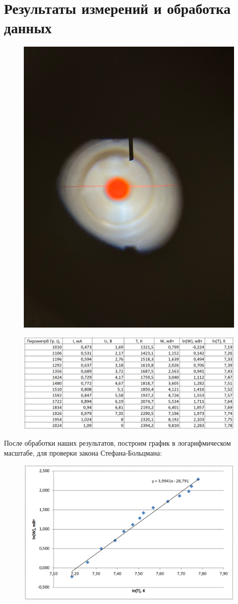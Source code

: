 \documentclass[a4paper, 12pt]{article}
\begin{document}
    

\section{Результаты измерений и обработка данных} 

    \begin{figure}[H]
        \centering
        \includegraphics[width=0.4\linewidth]{res/5.png}
    \end{figure}

    \begin{figure}[H]
        \centering
        \includegraphics[width=0.7\linewidth]{res/3.png}
    \end{figure}

    После обработки наших результатов, построим график в логарифмическом масштабе, 
    для проверки закона Стефана-Больцмана:
    \begin{figure}[H]
        \centering
        \includegraphics[width=0.7\linewidth]{res/4.png}
    \end{figure}
\end{document}
